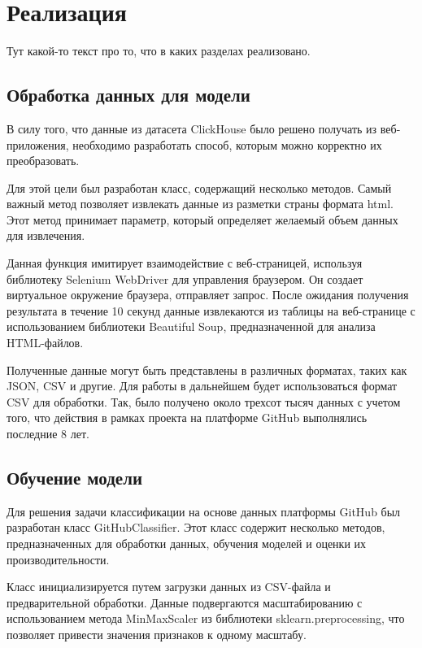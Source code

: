 \newpage
\section{Реализация}
\label{sec:Realization}

Тут какой-то текст про то, что в каких разделах реализовано.

\subsection{Обработка данных для модели}
\label{subsec:Parser}

В силу того, что данные из датасета ClickHouse было решено получать из веб-приложения, необходимо разработать способ, которым можно корректно их преобразовать.

Для этой цели был разработан класс, содержащий несколько методов. Самый важный метод позволяет извлекать данные из разметки страны формата html. Этот метод принимает параметр, который определяет желаемый объем данных для извлечения. 

Данная функция имитирует взаимодействие с веб-страницей, используя библиотеку Selenium WebDriver для управления браузером. Он создает виртуальное окружение браузера, отправляет запрос. После ожидания получения результата в течение 10 секунд данные извлекаются из таблицы на веб-странице с использованием библиотеки Beautiful Soup, предназначенной для анализа HTML-файлов. 

Полученные данные могут быть представлены в различных форматах, таких как JSON, CSV и другие. Для работы в дальнейшем будет использоваться формат CSV для обработки. Так, было получено около трехсот тысяч данных с учетом того, что действия в рамках проекта на платформе GitHub выполнялись последние 8 лет.

\subsection{Обучение модели}
\label{subsec:Learning}

Для решения задачи классификации на основе данных платформы GitHub был разработан класс GitHubClassifier. Этот класс содержит несколько методов, предназначенных для обработки данных, обучения моделей и оценки их производительности.

Класс инициализируется путем загрузки данных из CSV-файла и предварительной обработки. Данные подвергаются масштабированию с использованием метода MinMaxScaler из библиотеки sklearn.preprocessing, что позволяет привести значения признаков к одному масштабу.

